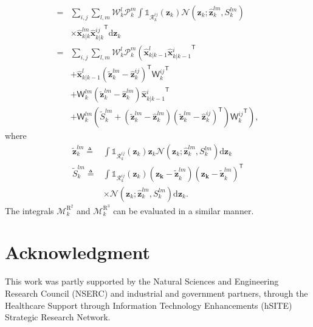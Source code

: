 \documentclass[10pt,twocolumn,twoside]{IEEEtran}
\newcommand{\tran}{^{\mathsf{T}}}
\begin{document}
{\begin{align}
\nonumber
=& \sum\limits_{i,j} \sum\limits_{l,m}  \mathcal{W}^l_k\mathcal{P}^m_k \int \mathds{1}_{\mathcal{R}^{ij}_k}{\left(\mathbf{z}_k\right)}\mathcal{N}\left(\mathbf{z}_k; \mathbf{\hat{z}}_{k}^{lm}, S_k^{lm}\right)\\ & \times \mathsf{\hat{\boldsymbol{x}}}_{k|k}^{lm}\mathsf{\hat{\boldsymbol{x}}}{_{k|k}^{ij}}\tran \mathrm{d}\mathbf{{z}}_{k} \\
= & \sum\limits_{i,j} \sum\limits_{l,m}  \mathcal{W}^l_k\mathcal{P}^m_k \left(\mathbf{\hat{{x}}}_{k|k-1}^{l}\mathbf{\hat{{x}}}{_{k|k-1}^{i}}\tran\right.\\
&+ \mathbf{\hat{{x}}}_{k|k-1}^{l}\left( \mathbf{\tilde{z}}_{k}^{lm} - \mathbf{\hat{z}}_{k}^{ij} \right)\tran \mathsf{W}{_k^{ij}}\tran \\
&+ \mathsf{W}_k^{lm}\left( \mathbf{\tilde{z}}_{k}^{lm} - \mathbf{\hat{z}}_{k}^{lm} \right)\mathbf{\hat{{x}}}{_{k|k-1}^{i}}\tran \\
&\left.+ \mathsf{W}_k^{lm}\left(\tilde{S}_k^{lm} + \left(\mathbf{\tilde{z}}_{k}^{lm} - \mathbf{\hat{z}}_{k}^{lm}\right) \left(\mathbf{\tilde{z}}_{k}^{lm} - \mathbf{\hat{z}}_{k}^{ij}\right) \tran \right)\mathsf{W}{_k^{ij}}\tran \right),
\end{align}
where
\begin{align}
\mathbf{\tilde{z}}_{k}^{lm} \triangleq & \int  \mathds{1}_{\mathcal{R}^{ij}_k}{\left(\mathbf{z}_k\right)}\mathbf{{z}}_{k}\mathcal{N}\left(\mathbf{z}_k; \mathbf{\hat{z}}_{k}^{lm}, S_k^{lm}\right) \mathrm{d}\mathbf{{z}}_{k} \\
\tilde{S}_k^{lm} \triangleq & \int  \mathds{1}_{\mathcal{R}^{ij}_k}{\left(\mathbf{z}_k\right)}\left(\mathbf{\mathbf{z}_k-\tilde{z}}_{k}^{lm}\right) \left(\mathbf{\mathbf{z}_k-\tilde{z}}_{k}^{lm}\right) \tran \\
& \times \mathcal{N}\left(\mathbf{z}_k; \mathbf{\hat{z}}_{k}^{lm}, S_k^{lm}\right) \mathrm{d}\mathbf{{z}}_{k}.
\end{align}
The integrals \(\mathcal{M}^{\mathrm{R}^2}_k\) and \(\mathcal{M}^{\mathrm{R}^3}_k\) can be evaluated in a similar manner.} 



\section*{Acknowledgment}

This work was partly supported by the Natural Sciences and Engineering Research Council (NSERC) and industrial and government partners, through the Healthcare Support through Information Technology Enhancements (hSITE) Strategic Research Network.


\ifCLASSOPTIONcaptionsoff
  \newpage
\fi








\end{document}
